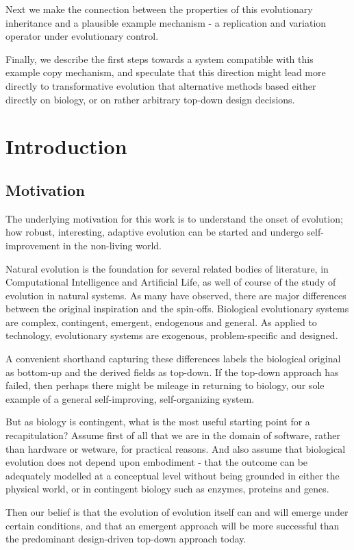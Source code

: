 \documentclass[]{report}
\begin{document}
Next we make the connection between the properties of this evolutionary inheritance and a plausible example mechanism  - a replication and variation operator under evolutionary control.

Finally, we describe the first steps towards a system compatible with this example copy mechanism, and speculate that this direction might lead more directly to transformative evolution that alternative methods based either directly on biology, or on rather arbitrary top-down design decisions.

\chapter{Introduction}

\section{Motivation}
The underlying motivation for this work is to understand the onset of evolution; how robust, interesting, adaptive evolution can be started and undergo self-improvement in the non-living world.

Natural evolution is the foundation for several related bodies of literature, in Computational Intelligence and Artificial Life, as well of course of the study of evolution in natural systems. As many have observed, there are major differences between the original inspiration and the spin-offs. Biological evolutionary systems are complex, contingent, emergent, endogenous and general. As applied to technology, evolutionary systems are exogenous, problem-specific and designed.

A convenient shorthand capturing these differences labels the biological original as bottom-up and the derived fields as top-down. If the top-down approach has failed, then perhaps there might be mileage in returning to biology, our sole example of a general self-improving, self-organizing system.

But as biology is contingent, what is the most useful starting point for a recapitulation? Assume first of all that we are in the domain of software, rather than hardware or wetware, for practical reasons. And also assume that biological evolution does not depend upon embodiment - that the outcome can be adequately modelled at a conceptual level without being grounded in either the physical world, or in contingent biology such as enzymes, proteins and genes.

Then our belief is that the evolution of evolution itself can and will emerge under certain conditions, and that an emergent approach will be more successful than the predominant design-driven top-down approach today.
\end{document}
